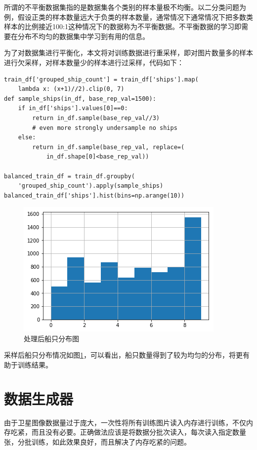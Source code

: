所谓的不平衡数据集指的是数据集各个类别的样本量极不均衡。以二分类问题为例，假设正类的样本数量远大于负类的样本数量，通常情况下通常情况下把多数类样本的比例接近100:1这种情况下的数据称为不平衡数据。不平衡数据的学习即需要在分布不均匀的数据集中学习到有用的信息。

为了对数据集进行平衡化，本文将对训练数据进行重采样，即对图片数量多的样本进行欠采样，对样本数量少的样本进行过采样，代码如下：

\begin{lstlisting}
train_df['grouped_ship_count'] = train_df['ships'].map(
    lambda x: (x+1)//2).clip(0, 7)
def sample_ships(in_df, base_rep_val=1500):
    if in_df['ships'].values[0]==0:
        return in_df.sample(base_rep_val//3)
        # even more strongly undersample no ships
    else:
        return in_df.sample(base_rep_val, replace=(
            in_df.shape[0]<base_rep_val))
    
balanced_train_df = train_df.groupby(
    'grouped_ship_count').apply(sample_ships)
balanced_train_df['ships'].hist(bins=np.arange(10))
\end{lstlisting}

\begin{figure}
\centering
\includegraphics[width=0.7\linewidth]{body/preprocessing_pic/5}
\caption{处理后船只分布图}
\label{fig::preprocessing5}
\end{figure}

采样后船只分布情况如图\ref{fig::preprocessing5}，可以看出，船只数量得到了较为均匀的分布，将更有助于训练结果。

\section{数据生成器}

由于卫星图像数据量过于庞大，一次性将所有训练图片读入内存进行训练，不仅内存吃紧，而且没有必要。正确做法应该是将数据分批次读入，每次读入指定数量张，分批训练，如此效果良好，而且解决了内存吃紧的问题。

